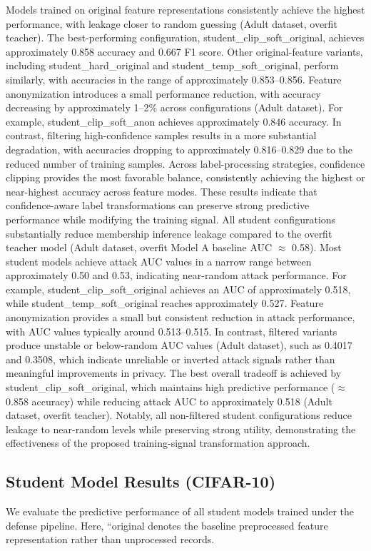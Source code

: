 \documentclass[conference]{IEEEtran}
\begin{document}
Models trained on original feature representations consistently achieve the highest performance, with leakage closer to random guessing (Adult dataset, overfit teacher). The best-performing configuration, student\_clip\_soft\_original, achieves approximately 0.858 accuracy and 0.667 F1 score. Other original-feature variants, including student\_hard\_original and student\_temp\_soft\_original, perform similarly, with accuracies in the range of approximately 0.853--0.856.
Feature anonymization introduces a small performance reduction, with accuracy decreasing by approximately 1--2\% across configurations (Adult dataset). For example, student\_clip\_soft\_anon achieves approximately 0.846 accuracy. In contrast, filtering high-confidence samples results in a more substantial degradation, with accuracies dropping to approximately 0.816--0.829 due to the reduced number of training samples.
Across label-processing strategies, confidence clipping provides the most favorable balance, consistently achieving the highest or near-highest accuracy across feature modes. These results indicate that confidence-aware label transformations can preserve strong predictive performance while modifying the training signal.
All student configurations substantially reduce membership inference leakage compared to the overfit teacher model (Adult dataset, overfit Model A baseline AUC $\approx$ 0.58). Most student models achieve attack AUC values in a narrow range between approximately 0.50 and 0.53, indicating near-random attack performance. For example, student\_clip\_soft\_original achieves an AUC of approximately 0.518, while student\_temp\_soft\_original reaches approximately 0.527.
Feature anonymization provides a small but consistent reduction in attack performance, with AUC values typically around 0.513--0.515. In contrast, filtered variants produce unstable or below-random AUC values (Adult dataset), such as 0.4017 and 0.3508, which indicate unreliable or inverted attack signals rather than meaningful improvements in privacy.
The best overall tradeoff is achieved by student\_clip\_soft\_original, which maintains high predictive performance ($\approx$0.858 accuracy) while reducing attack AUC to approximately 0.518 (Adult dataset, overfit teacher). Notably, all non-filtered student configurations reduce leakage to near-random levels while preserving strong utility, demonstrating the effectiveness of the proposed training-signal transformation approach.

\subsection{Student Model Results (CIFAR-10)}
We evaluate the predictive performance of all student models trained under the defense pipeline. Here, ``original denotes the baseline preprocessed feature representation rather than unprocessed records.
\end{document}
